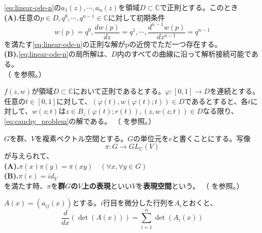 \begin{theorem}\label{thm:linear_ode_existence_and_continuation}
    \eqref{eq:linear-ode-n}の$a_{1}(z),\cdots,a_{n}(z)$を領域$D\subset\mathbb{C}$で正則とする。このとき\\
    \textbf{(A).}任意の$p\in D,q^{0},\cdots,q^{n-1}\in\mathbb{C}$に対して初期条件
    \[
    w(p)=q^{0},\frac{dw(p)}{dz}=q^{1},\cdots,\frac{d^{n-1}w(p)}{dz^{n-1}}=q^{n-1}
    \]
    を満たす\eqref{eq:linear-ode-n}の正則な解がpの近傍でただ一つ存在する。\\
    \textbf{(B).}\eqref{eq:linear-ode-n}の局所解は、$D$内のすべての曲線に沿って解析接続可能である。\\
    （\cite[p.127 定理25.3]{book:kimura} を参照。）
\end{theorem}
\begin{theorem}[解の解析接続定理]\label{thm:ode_solution_continuation}
   $f(z,w)$が領域$D\subset\mathbb{C}$において正則であるとする。$\varphi:[0,1]\to D$を連続とする。任意の$t\in[0,1]$に対して、$(\varphi(t),w(\varphi(t);t))\in D$であるとすると、各$t$に対して、$w(z;t)$は$z\in B_{z}(\varphi(t);r(t)), (z,w(z;t))\in D$なる限り、\eqref{eq:cauchy_problem}の解である。
   （\cite[p.56 定理8.6]{book:takano} を参照。）
\end{theorem}
\begin{definition}[表現]\label{dfn:representation}
    $G$を群、$V$を複素ベクトル空間とする。$G$の単位元を$e$と書くことにする。写像
    \[
    \pi:G\to GL_{\mathbb{C}}(V)
    \]
    が与えられて、\\
    \textbf{(A).}$\pi(x)\pi(y)=\pi(xy)\quad(\forall x, \forall y\in G)$\\
    \textbf{(B).}$\pi(e)=id_{V}$\\
    を満たす時、$\pi$を\textbf{群$G$の$V$上の表現}といい$V$を\textbf{表現空間}という。
    （\cite[p.10 定義1.12]{book:kobayashi} を参照。）
\end{definition}
\begin{theorem}[行列の微分]\label{thm:derivative-of-determinant}
    $A(x)=(a_{ij}(x))$とする。$i$行目を微分した行列を$A_{i}$とおくと、
    \[
    \frac{d}{dx}(\det(A(x)))=\sum_{i=1}^{n}\det(A_{i}(x))
    \]
\end{theorem}

